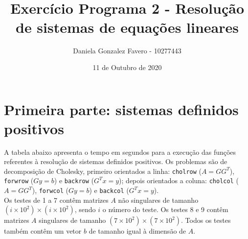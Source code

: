 \documentclass[a4paper,11pt]{article}
\title{Exercício Programa 2 - Resolução de sistemas de equações lineares}
\author{
  Daniela Gonzalez Favero - 10277443
}
\date{11 de Outubro de 2020}
\newcommand\tab[1][.5cm]{\hspace*{#1}}
\begin{document}
\maketitle


\section*{Primeira parte:  sistemas definidos positivos}

\tab A tabela abaixo apresenta o tempo em segundos para a execução das funções referentes à resolução de sistemas definidos positivos. Os problemas são de decomposição de Cholesky, primeiro orientados a linha: \texttt{cholrow} ($A=GG^T$), \texttt{forwrow} ($Gy=b$) e \texttt{backrow} ($G^Tx=y$); depois orientados a coluna: \texttt{cholcol} ($A=GG^T$), \texttt{forwcol} ($Gy=b$) e \texttt{backcol} ($G^Tx=y$).\\
\tab Os testes de 1 a 7 contêm matrizes $A$ não singulares de tamanho $(i \times 10^2) \times (i \times 10^2)$, sendo $i$ o número do teste. Os testes 8 e 9 contêm matrizes $A$ singulares de tamanho $(7 \times 10^2) \times (7 \times 10^2)$. Todos os testes também contêm um vetor $b$ de tamanho igual à dimensão de $A$. \\
\end{document}
